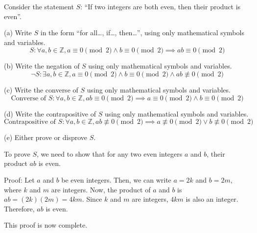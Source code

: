 \documentclass{article}
\begin{document}
Consider the statement $S$: ``If two integers are both even, then their product is even''.

(a) Write $S$ in the form ``for all\ldots, if\ldots, then\ldots'', using only mathematical symbols and variables.
\[
    S: \forall a, b \in \mathbb{Z}, a \equiv 0 \pmod{2} \land b \equiv 0 \pmod{2} \implies ab \equiv 0 \pmod{2}
\]

(b) Write the negation of $S$ using only mathematical symbols and variables.
\[
    \neg S: \exists a, b \in \mathbb{Z}, a \equiv 0 \pmod{2} \land b \equiv 0 \pmod{2} \land ab \not\equiv
    0 \pmod{2}
\]

(c) Write the converse of $S$ using only mathematical symbols and variables.
\[
    \text{Converse of } S: \forall a, b \in \mathbb{Z}, ab \equiv 0 \pmod{2} \implies a \equiv 0 \pmod{2} \land b \equiv 0 \pmod{2}
\]

(d) Write the contrapositive of $S$ using only mathematical symbols and variables.
\[
    \text{Contrapositive of } S: \forall a, b \in \mathbb{Z}, ab \not\equiv 0 \pmod{2} \implies a \not\equiv 0 \pmod{2} \lor b \not\equiv 0 \pmod{2}
\]

(e) Either prove or disprove $S$.

To prove $S$, we need to show that for any two even integers $a$ and $b$, their product $ab$ is even.

Proof: Let $a$ and $b$ be even integers. Then, we can write $a = 2k$ and $b = 2m$, where $k$ and $m$ are integers. Now, the product of $a$ and $b$ is $ab = (2k)(2m) = 4km$. Since $k$ and $m$ are integers, $4km$ is also an integer. Therefore, $ab$ is even.

This proof is now complete.
\end{document}
